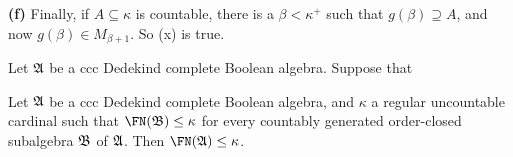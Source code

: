 {\medskip

{\bf (f)} Finally, if $A\subseteq\kappa$ is countable, there is a
$\beta<\kappa^+$ such that $g(\beta)\supseteq A$, and now
$g(\beta)\in M_{\beta+1}$.   So (x) is true.
}%

 Let
$\frak A$ be a ccc Dedekind complete Boolean algebra.   Suppose that


\noindent Let $\frak A$ be a ccc Dedekind complete Boolean algebra, and
$\kappa$ a regular uncountable cardinal such that
$\FN(\frak B)\le\kappa$
for every countably generated order-closed subalgebra $\frak B$ of
$\frak A$.    Then $\FN(\frak A)\le\kappa$.

